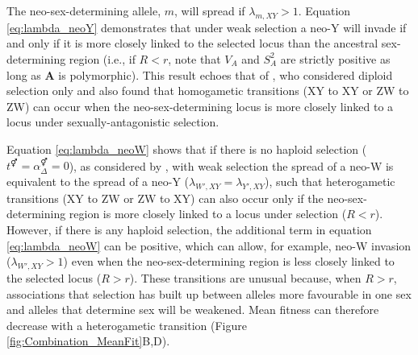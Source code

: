 \documentclass[12pt]{article}
\begin{document}
The neo-sex-determining allele, $m$, will spread if $\lambda_{m,XY}>1$. 
Equation \eqref{eq:lambda_neoY} demonstrates that under weak selection a neo-Y will invade if and only if it is more closely linked to the selected locus than the ancestral sex-determining region (i.e., if $R<r$, note that $V_{A}$ and $S_{A}^2$ are strictly positive as long as \textbf{A} is polymorphic). 
This result echoes that of \citet{vanDoorn:2007eu}, who considered diploid selection only and also found that homogametic transitions (XY to XY or ZW to ZW) can occur when the neo-sex-determining locus is more closely linked to a locus under sexually-antagonistic selection. 

Equation \eqref{eq:lambda_neoW} shows that if there is no haploid selection ($t^\Hermaphrodite=\alpha^\Hermaphrodite_{\Delta}=0$), as considered by \citet{vanDoorn:2010hu}, with weak selection the spread of a neo-W is equivalent to the spread of a neo-Y ($\lambda_{W',XY}=\lambda_{Y',XY}$), such that heterogametic transitions (XY to ZW or ZW to XY) can also occur only if the neo-sex-determining region is more closely linked to a locus under selection ($R<r$). 
However, if there is any haploid selection, the additional term in equation \eqref{eq:lambda_neoW} can be positive, which can allow, for example, neo-W invasion ($\lambda_{W',XY}>1$) even when the neo-sex-determining region is less closely linked to the selected locus ($R>r$). 
These transitions are unusual because, when $R>r$, associations that selection has built up between alleles more favourable in one sex and alleles that determine sex will be weakened. 
Mean fitness can therefore decrease with a heterogametic transition (Figure \ref{fig:Combination_MeanFit}B,D). 
\end{document}

